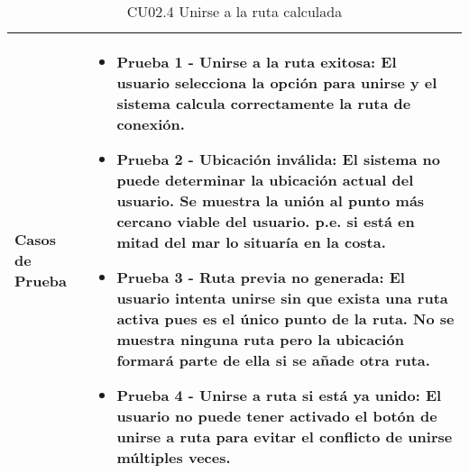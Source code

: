 \begin{table}[H]
\begin{tabularx}{\linewidth}{ p{} p{} }
		\textbf{Casos de Prueba}      &
		\begin{itemize}
			\item \textbf{Prueba 1 - Unirse a la ruta exitosa:} El usuario selecciona la opción para unirse y el sistema calcula correctamente la ruta de conexión.
			\vspace{2pt}
			\item \textbf{Prueba 2 - Ubicación inválida:} El sistema no puede determinar la ubicación actual del usuario. Se muestra la unión al punto más cercano viable del usuario. p.e. si está en mitad del mar lo situaría en la costa.
			\vspace{2pt}
			\item \textbf{Prueba 3 - Ruta previa no generada:} El usuario intenta unirse sin que exista una ruta activa pues es el único punto de la ruta. No se muestra ninguna ruta pero la ubicación formará parte de ella si se añade otra ruta.
			\vspace{2pt}
			\item \textbf{Prueba 4 - Unirse a ruta si está ya unido:} El usuario no puede tener activado el botón de unirse a ruta para evitar el conflicto de unirse múltiples veces.
		\end{itemize} \\
		\bottomrule
	\end{tabularx}
	\caption{CU02.4 Unirse a la ruta calculada}
	\label{cu:unirse-ruta}
\end{table}


